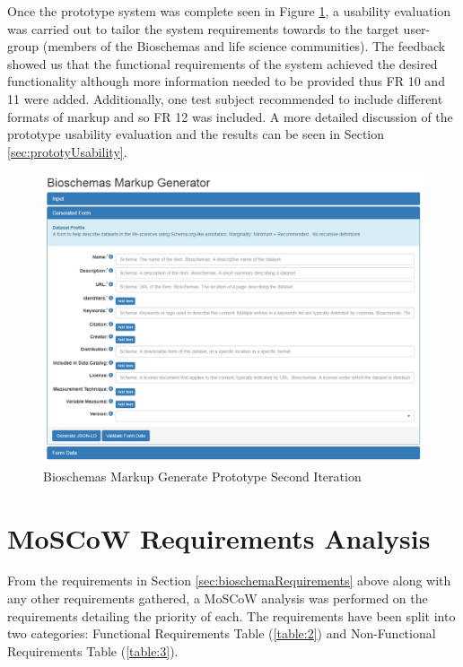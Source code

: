 Once the prototype system was complete seen in Figure \ref{fig:bioProto}, a usability evaluation was carried out to tailor the system requirements towards to the target user-group (members of the Bioschemas and life science communities). The feedback showed us that the functional requirements of the system achieved the desired functionality although more information needed to be provided thus FR 10 and 11 were added. Additionally, one test subject recommended to include different formats of markup and so FR 12 was included. A more detailed discussion of the prototype usability evaluation and the results can be seen in Section \ref{sec:prototyUsability}.\newline

\begin{figure}[h]
 \centering\includegraphics[scale=0.5]{images/bioschemasPrototype.PNG}
   \caption{Bioschemas Markup Generate Prototype Second Iteration}
   \label{fig:bioProto}
\end{figure}

\newpage
\section{MoSCoW Requirements Analysis}
From the requirements in Section \ref{sec:bioschemaRequirements} above along with any other requirements gathered, a MoSCoW analysis was performed on the requirements detailing the priority of each. The requirements have been split into two categories: Functional Requirements Table (\ref{table:2}) and Non-Functional Requirements Table (\ref{table:3}).

